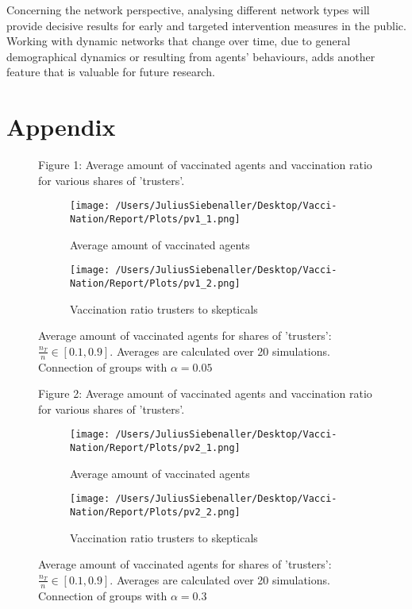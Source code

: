 \documentclass[11pt]{article}
\begin{document}
Concerning the network perspective, analysing different network types will provide decisive results for early and targeted intervention measures in the public. Working with dynamic networks that change over time, due to general demographical dynamics or resulting from agents' behaviours, adds another feature that is valuable for future research.  

\clearpage
\section*{Appendix}
\begin{figure}[htbp]%
\centering
	Figure 1: Average amount of vaccinated agents and vaccination ratio for various shares of 'trusters'. \\  
  \begin{subfigure}[b]{0.45\textwidth}
    \texttt{[image: /Users/JuliusSiebenaller/Desktop/Vacci-Nation/Report/Plots/pv1\_1.png]}
    \caption{Average amount of vaccinated agents}
    \label{fig:1a}
  \end{subfigure}
  \begin{subfigure}[b]{0.45\textwidth}
    \texttt{[image: /Users/JuliusSiebenaller/Desktop/Vacci-Nation/Report/Plots/pv1\_2.png]}
    \caption{Vaccination ratio trusters to skepticals}
    \label{fig:1b}
  \end{subfigure}
  \caption{Average amount of vaccinated agents for shares of 'trusters': \(\frac{n_{T}}{n}\in[0.1,0.9]\). Averages are calculated over 20 simulations. Connection of groups with \(\alpha=0.05\)}
\end{figure}
\begin{figure}[htbp]%
\centering
	Figure 2: Average amount of vaccinated agents and vaccination ratio for various shares of 'trusters'. \\  
  \begin{subfigure}[b]{0.45\textwidth}
    \texttt{[image: /Users/JuliusSiebenaller/Desktop/Vacci-Nation/Report/Plots/pv2\_1.png]}
    \caption{Average amount of vaccinated agents}
    \label{fig:2a}
  \end{subfigure}
  \begin{subfigure}[b]{0.45\textwidth}
    \texttt{[image: /Users/JuliusSiebenaller/Desktop/Vacci-Nation/Report/Plots/pv2\_2.png]}
    \caption{Vaccination ratio trusters to skepticals}
    \label{fig:2b}
  \end{subfigure}
  \caption{Average amount of vaccinated agents for shares of 'trusters': \(\frac{n_{T}}{n}\in[0.1,0.9]\). Averages are calculated over 20 simulations. Connection of groups with \(\alpha=0.3\)}
\end{figure}
\end{document}
